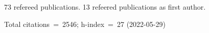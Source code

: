 73 refereed publications. 13 refeered publications as first author.

Total citations~=~2546; h-index~=~27 (2022-05-29)